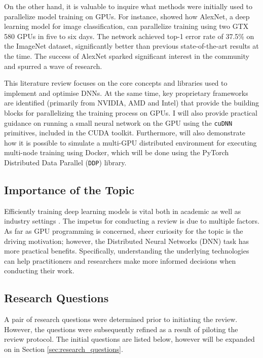 On the other hand, it is valuable to inquire what methods were initially used to parallelize model
training on GPUs. For instance, \cite{krizhevsky_imagenet_2012} showed how AlexNet, a deep learning
model for image classification, can parallelize training using two GTX 580 GPUs in five to six
days. The network achieved top-1 error rate of 37.5\% on the ImageNet dataset, significantly better
than previous state-of-the-art results at the time. The success of AlexNet sparked significant
interest in the community and spurred a wave of research.

This literature review focuses on the core concepts and libraries used to implement and optimise
DNNs. At the same time, key proprietary frameworks are identified (primarily from NVIDIA, AMD and
Intel) that provide the building blocks for parallelizing the training process on GPUs. I will also
provide practical guidance on running a small neural network on the GPU using the \texttt{cuDNN}
primitives, included in the CUDA toolkit. Furthermore, will also demonstrate how it is possible to
simulate a multi-GPU distributed environment for executing multi-node training using Docker, which
will be done using the PyTorch Distributed Data Parallel (\texttt{DDP}) library.


\subsection{Importance of the Topic}
\label{sec:importance_of_topic}
Efficiently training deep learning models is vital both in academic as well as industry settings
\cite{chahal_hitchhikers_2018, xing_strategies_2015}. The impetus for conducting a review
is due to multiple factors. As far as GPU programming is concerned, sheer curiosity for the topic is
the driving motivation; however, the Distributed Neural Networks (DNN) task has more practical benefits.
Specifically, understanding the underlying technologies can help practitioners and researchers make more
informed decisions when conducting their work.

\subsection{Research Questions}
\label{sec:initial_research_questions}
A pair of research questions were determined prior to initiating the review. However, the questions
were subsequently refined as a result of piloting the review protocol. The initial questions are listed below,
however will be expanded on in Section \ref{sec:research_questions}.

